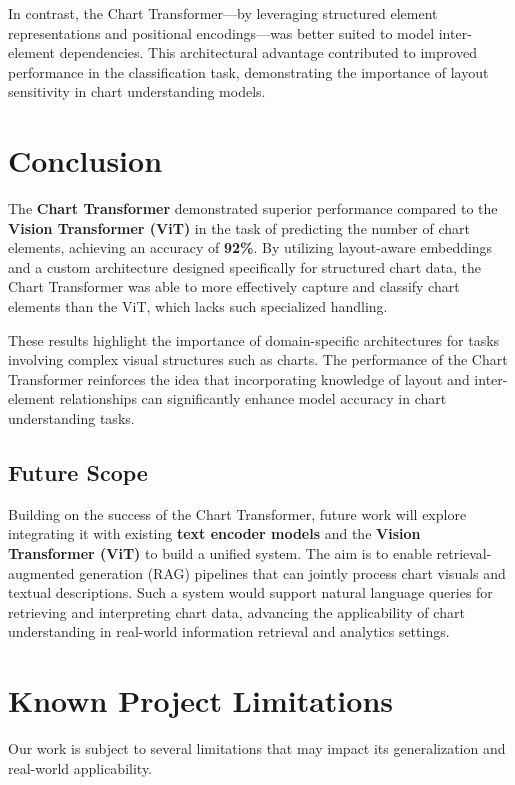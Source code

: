 \documentclass[11pt]{article}
\begin{document}
In contrast, the Chart Transformer—by leveraging structured element representations and positional encodings—was better suited to model inter-element dependencies. This architectural advantage contributed to improved performance in the classification task, demonstrating the importance of layout sensitivity in chart understanding models.


\section{Conclusion} 
The \textbf{Chart Transformer} demonstrated superior performance compared to the \textbf{Vision Transformer (ViT)} in the task of predicting the number of chart elements, achieving an accuracy of \textbf{92\%}. By utilizing layout-aware embeddings and a custom architecture designed specifically for structured chart data, the Chart Transformer was able to more effectively capture and classify chart elements than the ViT, which lacks such specialized handling.

These results highlight the importance of domain-specific architectures for tasks involving complex visual structures such as charts. The performance of the Chart Transformer reinforces the idea that incorporating knowledge of layout and inter-element relationships can significantly enhance model accuracy in chart understanding tasks.

\subsection*{Future Scope}

Building on the success of the Chart Transformer, future work will explore integrating it with existing \textbf{text encoder models} and the \textbf{Vision Transformer (ViT)} to build a unified system. The aim is to enable retrieval-augmented generation (RAG) pipelines that can jointly process chart visuals and textual descriptions. Such a system would support natural language queries for retrieving and interpreting chart data, advancing the applicability of chart understanding in real-world information retrieval and analytics settings.


\section{Known Project Limitations}

Our work is subject to several limitations that may impact its generalization and real-world applicability.
\end{document}
